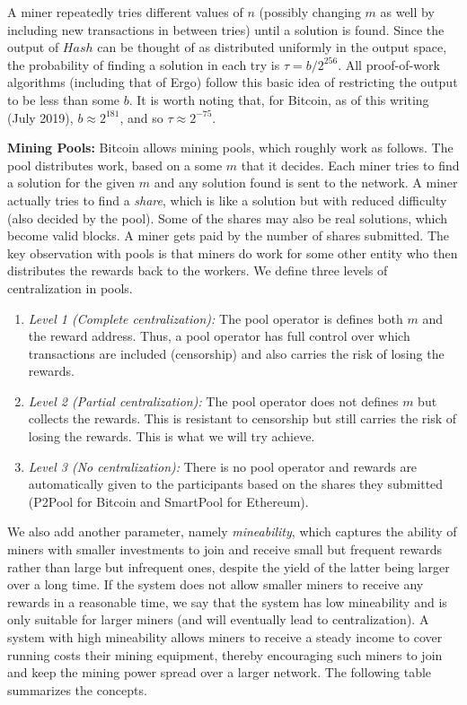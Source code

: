 \documentclass[11pt]{article}
\begin{document}
A miner repeatedly tries different values of $n$ (possibly changing $m$ as well by including new transactions in between tries) until a solution is found. Since the output of $Hash$ can be thought of as distributed uniformly in the output space, the probability of finding a solution in each try is $\tau = b/2^{256}$. All proof-of-work algorithms (including that of Ergo) follow this basic idea of restricting the output to be less than some $b$. It is worth noting that, for Bitcoin, as of this writing (July 2019), $b\approx 2^{181}$, and so $\tau \approx 2^{-75}$. %

\textbf{Mining Pools:} Bitcoin allows mining pools, which roughly work as follows. The pool distributes work, based on a some $m$ that it decides. Each miner tries to find a solution for the given $m$ and any solution found is sent to the network. 
A miner actually tries to find a {\em share}, which is like a solution but with reduced difficulty (also decided by the pool). Some of the shares may also be real solutions, which become valid blocks. A miner gets paid by the number of shares submitted.
The key observation with pools is that miners do work for some other entity who then distributes the rewards back to the workers.
We define three levels of centralization in pools. 

\begin{enumerate}
	\item {\em Level 1 (Complete centralization):} The pool operator is defines both $m$ and the reward address. Thus, a pool operator has full control over which transactions are included (censorship) and also carries the risk of losing the rewards.
	\item {\em Level 2 (Partial centralization):} The pool operator does not defines $m$ but collects the rewards. This is resistant to censorship but still carries the risk of losing the rewards. This is what we will try achieve. 
	\item {\em Level 3 (No centralization):} There is no pool operator and rewards are automatically given to the participants based on the shares they submitted (P2Pool for Bitcoin and SmartPool for Ethereum).
\end{enumerate}
We also add another parameter, namely {\em mineability}, which captures the ability of miners with smaller investments to join and receive small but frequent rewards rather than large but infrequent ones, despite the yield of the latter being larger over a long time. If the system does not allow smaller miners to receive any rewards in a reasonable time, we say that the system has low mineability and is only suitable for larger miners (and will eventually lead to centralization). A system with high mineability allows miners to receive a steady income to cover running costs their mining equipment, thereby encouraging such miners to join and keep the mining power spread over a larger network.
The following table summarizes the concepts.\\
\end{document}
